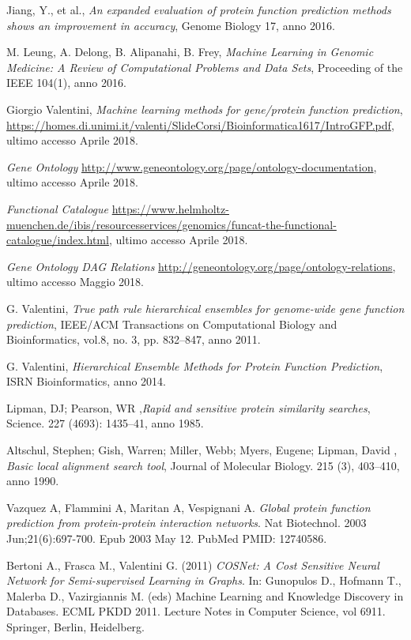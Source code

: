 \documentclass[12pt]{report}
\begin{document}
\begin{thebibliography}{00}

Jiang, Y., et al., \emph{An expanded evaluation of protein function prediction methods shows an improvement in accuracy}, Genome Biology 17, anno 2016.

 M. Leung, A. Delong, B. Alipanahi, B. Frey, \emph{Machine Learning in Genomic Medicine: A Review of Computational Problems and Data Sets},  Proceeding of the IEEE 104(1), anno 2016.

 Giorgio Valentini, \emph{Machine learning methods for gene/protein function prediction}, 
\url{https://homes.di.unimi.it/valenti/SlideCorsi/Bioinformatica1617/IntroGFP.pdf}, ultimo accesso Aprile 2018.

\emph{Gene Ontology} \url{http://www.geneontology.org/page/ontology-documentation}, ultimo accesso Aprile 2018.


 \emph{Functional Catalogue} \url{https://www.helmholtz-muenchen.de/ibis/resourcesservices/genomics/funcat-the-functional-catalogue/index.html}, ultimo accesso Aprile 2018.

\emph{Gene Ontology DAG Relations} \url{http://geneontology.org/page/ontology-relations}, ultimo accesso Maggio 2018.

 G. Valentini, \emph{True path rule hierarchical ensembles for genome-wide gene function prediction}, IEEE/ACM Transactions on Computational Biology and Bioinformatics, vol.8, no.
3, pp. 832–847, anno 2011.

 G. Valentini,  \emph{Hierarchical Ensemble Methods for Protein Function Prediction}, ISRN Bioinformatics, anno 2014.

 Lipman, DJ; Pearson, WR ,\emph{Rapid and sensitive protein similarity searches}, Science. 227 (4693): 1435–41, anno 1985.

 Altschul, Stephen; Gish, Warren; Miller, Webb; Myers, Eugene; Lipman, David , \emph{Basic local alignment search tool}, Journal of Molecular Biology. 215 (3), 403–410, anno 1990.

 Vazquez A, Flammini A, Maritan A, Vespignani A. \emph{Global protein function prediction from protein-protein interaction networks}. Nat Biotechnol. 2003
Jun;21(6):697-700. Epub 2003 May 12. PubMed PMID: 12740586.

 Bertoni A., Frasca M., Valentini G. (2011) \emph{COSNet: A Cost Sensitive Neural Network for Semi-supervised Learning in Graphs}. In: Gunopulos D., Hofmann T., Malerba D., Vazirgiannis M. (eds) Machine Learning and Knowledge Discovery in Databases. ECML PKDD 2011. Lecture Notes in Computer Science, vol 6911. Springer, Berlin, Heidelberg.


\end{thebibliography}
\end{document}
